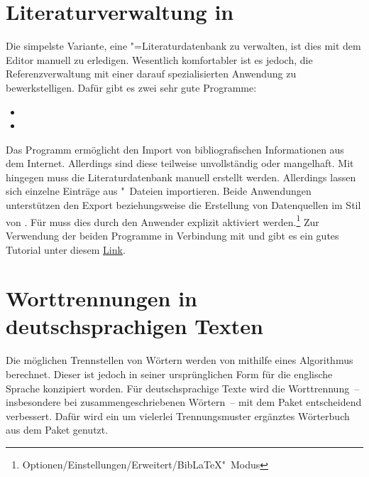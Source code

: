 \section{%
  Literaturverwaltung in %
}

%
Die simpelste Variante, eine "=Literaturdatenbank zu verwalten,
ist dies mit dem Editor manuell zu erledigen. Wesentlich komfortabler ist es 
jedoch, die Referenzverwaltung mit einer darauf spezialisierten Anwendung zu 
bewerkstelligen. Dafür gibt es zwei sehr gute Programme:
%
\begin{itemize}
\item {}
\item {}
\end{itemize}

Das Programm  ermöglicht den Import von bibliografischen 
Informationen aus dem Internet. Allerdings sind diese teilweise unvollständig 
oder mangelhaft. Mit  hingegen muss die Literaturdatenbank 
manuell erstellt werden. Allerdings lassen sich einzelne Einträge aus 
"~Dateien importieren. Beide Anwendungen unterstützen den Export 
beziehungsweise die Erstellung von Datenquellen im Stil von . 
Für  muss dies durch den Anwender explizit aktiviert 
werden.\footnote{Optionen/Einstellungen/Erweitert/BibLaTeX"~Modus} 
Zur Verwendung der beiden Programme in Verbindung mit  und 
 gibt es ein gutes Tutorial unter diesem
\href{http://www.suedraum.de/latex/stammtisch/degenkolb_latex_biblatex_folien-final.pdf}{Link}.



\section{%
  Worttrennungen in deutschsprachigen Texten%
  \label{sec:tips:hyphenation}%
}

%
Die möglichen Trennstellen von Wörtern werden von  mithilfe 
eines Algorithmus berechnet. Dieser ist jedoch in seiner ursprünglichen Form 
für die englische Sprache konzipiert worden. Für deutschsprachige Texte wird 
die Worttrennung~-- insbesondere bei zusammengeschriebenen Wörtern~-- mit dem 
Paket  entscheidend verbessert. Dafür wird ein um vielerlei 
Trennungsmuster ergänztes Wörterbuch aus dem Paket  
genutzt. 

